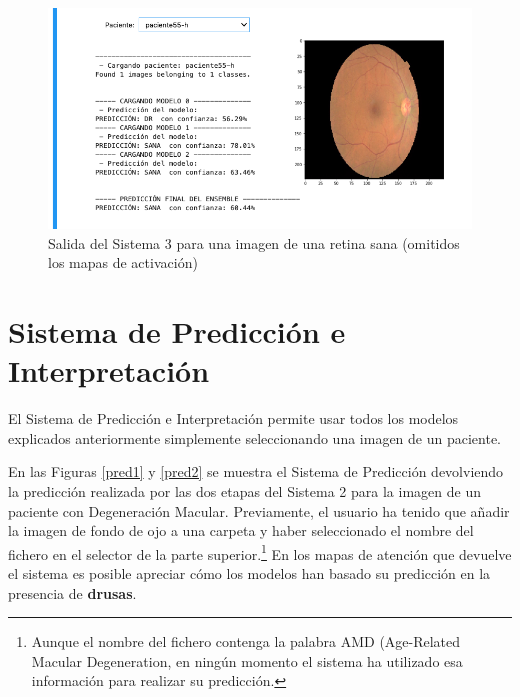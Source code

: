 \documentclass[
  12pt,
  spanish,
  a4paperpaper,
]{report}
\begin{document}
\begin{figure}
\centering
\includegraphics[width=1\textwidth,height=\textheight]{source/figures/s333.png}
\caption{Salida del Sistema 3 para una imagen de una retina sana
(omitidos los mapas de activación) \label{s333}}
\end{figure}

\newpage

\hypertarget{sistema-de-predicciuxf3n-e-interpretaciuxf3n}{%
\section{Sistema de Predicción e
Interpretación}\label{sistema-de-predicciuxf3n-e-interpretaciuxf3n}}

El Sistema de Predicción e Interpretación permite usar todos los modelos
explicados anteriormente simplemente seleccionando una imagen de un
paciente.

En las Figuras \ref{pred1} y \ref{pred2} se muestra el Sistema de
Predicción devolviendo la predicción realizada por las dos etapas del
Sistema 2 para la imagen de un paciente con Degeneración Macular.
Previamente, el usuario ha tenido que añadir la imagen de fondo de ojo a
una carpeta y haber seleccionado el nombre del fichero en el selector de
la parte superior.\footnote{Aunque el nombre del fichero contenga la
  palabra AMD (Age-Related Macular Degeneration, en ningún momento el
  sistema ha utilizado esa información para realizar su predicción.} En
los mapas de atención que devuelve el sistema es posible apreciar cómo
los modelos han basado su predicción en la presencia de \textbf{drusas}.
\end{document}
